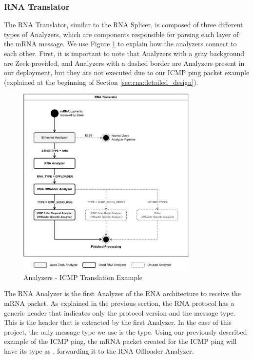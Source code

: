 \subsubsection*{RNA Translator}

The RNA Translator, similar to the RNA Splicer, is composed of three different types of Analyzers, which are components responsible for parsing each layer of the mRNA message. We use Figure \ref{fig:icmp_ex_translator} to explain how the analyzers connect to each other. First, it is important to note that Analyzers with a gray background are Zeek provided, and Analyzers with a dashed border are Analyzers present in our deployment, but they are not executed due to our ICMP ping packet example (explained at the beginning of Section \ref{sec:rna:detailed_design}).

\begin{figure}[ht]
    \caption{Analyzers - ICMP Translation Example}
    \begin{center}
        \includegraphics[width=0.8\textwidth]{images/icmp_ex_translator.pdf}  
    \end{center}
    \label{fig:icmp_ex_translator}
\end{figure}

The RNA Analyzer is the first Analyzer of the RNA architecture to receive the mRNA packet. As explained in the previous section, the RNA protocol has a generic header that indicates only the protocol version and the message type. This is the header that is extracted by the first Analyzer. In the case of this project, the only message type we use is the \Offloader{} type\footnotemark. Using our previously described example of the ICMP ping, the mRNA packet created for the ICMP ping will have its type as \textsc{\Offloader{}}, forwarding it to the RNA Offloader Analyzer.

